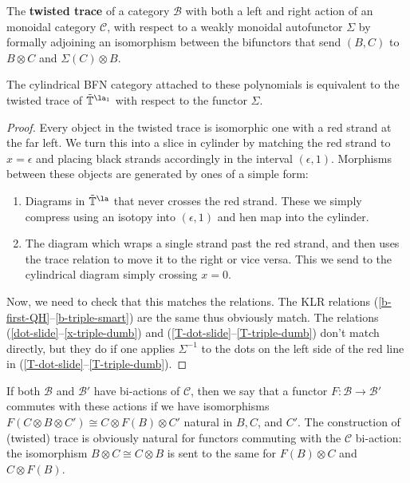 \begin{definition}
The {\bf twisted trace} of a category $\mathcal{B}$ with both a left and right action of an monoidal category $\mathcal{C}$, with respect to a weakly monoidal autofunctor $\Sigma$ by formally adjoining an isomorphism between the bifunctors that send $(B,C)$ to $B\otimes C$ and $\Sigma(C)\otimes B$.  
\end{definition} 

\begin{proposition}
The cylindrical BFN category attached to these polynomials is equivalent to the twisted trace of $\tilde{\mathbb{T}}^{\la_1}$ with respect to the functor $\Sigma$.
\end{proposition}
\begin{proof}
Every object in the twisted trace is isomorphic one with a red strand
at the far left.  We turn this into a slice in cylinder by matching
the red strand to $x=\epsilon$ and placing
black strands accordingly in the interval $(\epsilon,1)$.  
Morphisms between these objects are generated by ones of a simple form:
\begin{enumerate}
    \item Diagrams
in $\tilde{\mathbb{T}}^{\la}$ that never crosses the red
strand.  These we simply compress using an isotopy into $(\epsilon,1)$ and hen map into the cylinder.
\item The diagram which wraps a single strand past the  red strand,
and then uses the trace relation to move it to the right or vice versa. This we send to the cylindrical diagram simply crossing $x=0$.
\end{enumerate}
Now, we need to check that this matches the relations.  The KLR relations (\ref{b-first-QH}--\ref{b-triple-smart}) are the same thus obviously match.  
 The relations
(\ref{dot-slide}--\ref{x-triple-dumb}) and (\ref{T-dot-slide}--\ref{T-triple-dumb}) don't match directly, but they do if one applies $\Sigma^{-1}$ to the dots on the left side of the red line in (\ref{T-dot-slide}--\ref{T-triple-dumb}).
\end{proof}


If both $\mathcal{B}$ and $\mathcal{B}'$ have bi-actions of $ \mathcal{C}$, then we say that a functor $F\colon \mathcal{B}\to \mathcal{B}'$ commutes with these actions if we have isomorphisms $F(C\otimes B\otimes C')\cong C\otimes F(B)\otimes C'$ natural in $B, C$, and $C'$.
The construction of (twisted) trace is obviously natural for functors commuting with the $\mathcal{C}$ bi-action: the isomorphism $B\otimes C\cong C\otimes B$ is sent to the same for $F(B)\otimes C$ and $C\otimes F(B)$.

